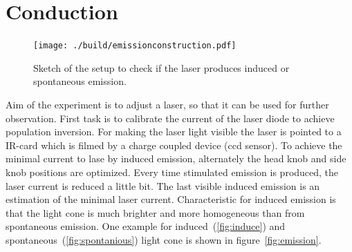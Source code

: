 \section{Conduction}%
\label{sec:conduction}
\begin{figure}
		\centering
		\texttt{[image: ./build/emissionconstruction.pdf]}
		\caption{Sketch of the setup to check if the laser produces induced or
		spontaneous emission. \cite{anleitung}}
		\label{fig:aufbau}
\end{figure}
Aim of the experiment is to adjust a laser, so that it can be used for further
observation.
First task is to calibrate the current of the laser diode to achieve population inversion. 
For making the laser light visible the laser is pointed to a IR-card 
which is filmed by a charge coupled device (ccd sensor).
To achieve the minimal current to lase by induced emission, alternately the head
knob and side knob positions are optimized.
Every time stimulated emission is produced, the laser current is reduced a
little bit. 
The last visible induced emission is an estimation of the minimal laser current.
Characteristic for induced emission is that the light cone is
much brighter and more homogeneous than from spontaneous emission.
One example for induced~(\ref{fig:induce}) and spontaneous~(\ref{fig:spontanious}) light cone is
shown in figure~\ref{fig:emission}.
